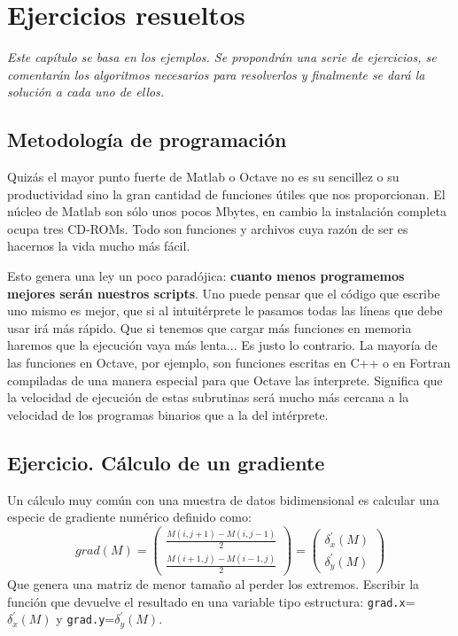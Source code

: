 \chapter{Ejercicios resueltos}


\emph{Este capítulo se basa en los ejemplos. Se propondrán una serie
de ejercicios, se comentarán los algoritmos necesarios para resolverlos
y finalmente se dará la solución a cada uno de ellos. }


\section*{Metodología de programación}

Quizás el mayor punto fuerte de Matlab o Octave no es su sencillez o
su productividad sino la gran cantidad de funciones útiles que nos
proporcionan. El núcleo de Matlab son sólo unos pocos Mbytes, en
cambio la instalación completa ocupa tres CD-ROMs. Todo son funciones
y archivos cuya razón de ser es hacernos la vida mucho más fácil.

Esto genera una ley un poco paradójica: \textbf{cuanto menos
  programemos mejores serán nuestros scripts}. Uno puede pensar que el
código que escribe uno mismo es mejor, que si al intuitérprete le pasamos
todas las líneas que debe usar irá más rápido. Que si tenemos que
cargar más funciones en memoria haremos que la ejecución vaya más
lenta...  Es justo lo contrario. La mayoría de las funciones en
Octave, por ejemplo, son funciones escritas en C++ o en Fortran
compiladas de una manera especial para que Octave las interprete.
Significa que la velocidad de ejecución de estas subrutinas será mucho
más cercana a la velocidad de los programas binarios que a la del
intérprete.


\section{Ejercicio. Cálculo de un gradiente}

Un cálculo muy común con una muestra de datos bidimensional es
calcular una especie de gradiente numérico definido como:$$
grad(M)=\left(\begin{array}{c}
    \frac{M(i,j+1)-M(i,j-1)}{2}\\
    \frac{M(i+1,j)-M(i-1,j)}{2}\end{array}\right)=\left(\begin{array}{c}
    \delta_{x}^{\prime}(M)\\
    \delta_{y}^{\prime}(M)\end{array}\right)$$ Que genera una matriz
de menor tamaño al perder los extremos. Escribir la función que
devuelve el resultado en una variable tipo estructura:
\texttt{grad.x}=$\delta_{x}^{\prime}(M)$ y
\texttt{grad.y}=$\delta_{y}^{\prime}(M)$.


